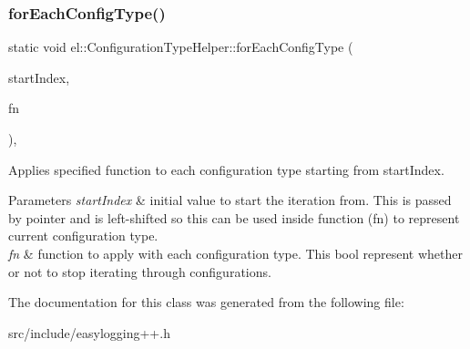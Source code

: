 \subsubsection{\texorpdfstring{for\+Each\+Config\+Type()}{forEachConfigType()}}
{\footnotesize\ttfamily static void el\+::\+Configuration\+Type\+Helper\+::for\+Each\+Config\+Type (\begin{DoxyParamCaption}\item[{base\+::type\+::\+Enum\+Type $\ast$}]{start\+Index,  }\item[{const std\+::function$<$ bool(void)$>$ \&}]{fn }\end{DoxyParamCaption})\hspace{0.3cm}{\ttfamily [inline]}, {\ttfamily [static]}}



Applies specified function to each configuration type starting from start\+Index. 


\begin{DoxyParams}{Parameters}
{\em start\+Index} & initial value to start the iteration from. This is passed by pointer and is left-\/shifted so this can be used inside function (fn) to represent current configuration type. \\
\hline
{\em fn} & function to apply with each configuration type. This bool represent whether or not to stop iterating through configurations. \\
\hline
\end{DoxyParams}


The documentation for this class was generated from the following file\+:\begin{DoxyCompactItemize}
\item 
src/include/easylogging++.\+h\end{DoxyCompactItemize}
